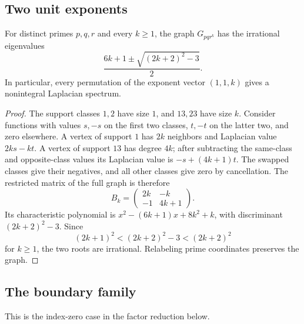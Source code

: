 \subsection{Two unit exponents}

\begin{theorem}
\label{thm:pqrk}
For distinct primes $p,q,r$ and every $k\geq1$, the graph $G_{pq r^k}$
has the irrational eigenvalues
\[
\frac{6k+1\pm\sqrt{(2k+2)^2-3}}2.
\]
In particular, every permutation of the exponent vector $(1,1,k)$
gives a nonintegral Laplacian spectrum.
\end{theorem}
\begin{proof}
The support classes $1,2$ have size $1$, and $13,23$ have size $k$.
Consider functions with values $s,-s$ on the first two classes,
$t,-t$ on the latter two, and zero elsewhere.
A vertex of support $1$ has $2k$ neighbors and Laplacian value
$2ks-kt$. A vertex of support $13$ has degree $4k$; after subtracting
the same-class and opposite-class values its Laplacian value is
$-s+(4k+1)t$. The swapped classes give their negatives, and all other
classes give zero by cancellation. The restricted matrix of the full
graph is therefore
\[
B_k=\begin{pmatrix}2k&-k\\-1&4k+1\end{pmatrix}.
\]
Its characteristic polynomial is $x^2-(6k+1)x+8k^2+k$, with
discriminant $(2k+2)^2-3$. Since
\[
(2k+1)^2<(2k+2)^2-3<(2k+2)^2
\]
for $k\geq1$, the two roots are irrational. Relabeling prime coordinates
preserves the graph.
\end{proof}
\subsection{The boundary family}
This is the index-zero case in the factor
reduction below.

